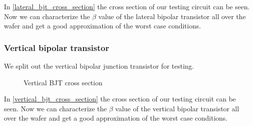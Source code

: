 In \autoref{lateral_bjt_cross_section} the cross section of our testing circuit can be seen.
Now we can characterize the $\beta$ value of the lateral bipolar transistor all over the wafer and get a good approximation of the worst case conditions.

\subsubsection{Vertical bipolar transistor}

We split out the vertical bipolar junction transistor for testing.

\begin{figure}[H]
	\centering
	\begin{tikzpicture}[node distance = 3cm, auto, thick,scale=0.5, every node/.style={transform shape}]
		
	\end{tikzpicture}
	\caption{Vertical BJT cross section}
	\label{vertical_bjt_cross_section}
\end{figure}

In \autoref{vertical_bjt_cross_section} the cross section of our testing circuit can be seen.
Now we can characterize the $\beta$ value of the vertical bipolar transistor all over the wafer and get a good approximation of the worst case conditions.
